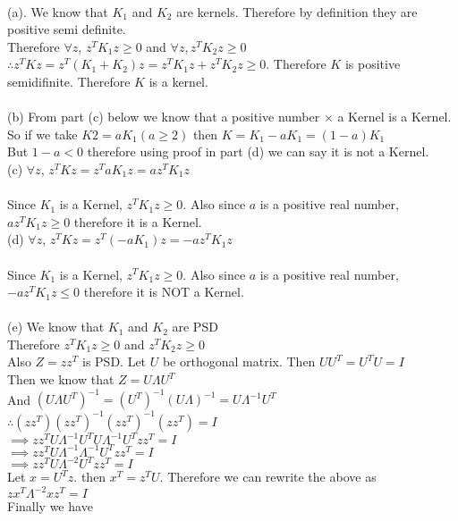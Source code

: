 \begin{answer}\\
(a). We know that $K_1$ and $K_2$ are kernels. Therefore by definition they are positive semi definite.\\
Therefore $\forall z$, $z^TK_1z \geq 0$ and $\forall z, z^TK_2z \geq 0$\\
$\therefore z^TKz=z^T(K_1+K_2)z = z^TK_1z+z^TK_2z \geq 0$. Therefore $K$ is positive semidifinite. Therefore $K$ is a kernel.\\
\\
(b) From part (c) below we know that a positive number $\times$ a Kernel is a Kernel. So if we take $K2=aK_1 (a \geq 2)$ then $K=K_1-aK_1=(1-a)K_1$\\
But $1-a <0$ therefore using proof in part (d) we can say it is not a Kernel.\\
(c) $\forall z$, $z^TKz=z^TaK_1z=az^TK_1z$\\\\
Since $K_1$ is a Kernel, $z^TK_1z \geq 0$. Also since $a$ is a positive real number, $az^TK_1z \geq 0$ therefore it is a Kernel.\\
(d) $\forall z$, $z^TKz=z^T(-aK_1)z=-az^TK_1z$\\\\
Since $K_1$ is a Kernel, $z^TK_1z \geq 0$. Also since $a$ is a positive real number, $-az^TK_1z \leq 0$ therefore it is NOT a Kernel.\\\\
(e) We know that $K_1$ and $K_2$ are PSD\\
Therefore $z^TK_1z \geq 0$ and $z^TK_2z \geq 0$\\
Also $Z=zz^T$ is PSD. Let $U$ be orthogonal matrix. Then $UU^T=U^TU=I$\\
Then we know that $Z=U\Lambda U^T$\\
And $(U\Lambda U^T)^{-1}=(U^T)^{-1}(U \Lambda)^{-1}=U \Lambda^{-1} U^T$\\
$\therefore (zz^T)(zz^T)^{-1}(zz^T)^{-1}(zz^T)=I$\\
$\implies zz^T U \Lambda^{-1} U^T U \Lambda^{-1} U^T zz^T=I$\\
$\implies zz^T U \Lambda^{-1} \Lambda^{-1} U^T zz^T=I$\\
$\implies zz^T U \Lambda^{-2} U^T zz^T=I$\\
Let $x=U^Tz$. then $x^T=z^TU$. Therefore we can rewrite the above as\\
$z x^T \Lambda^{-2} x z^T=I$\\
Finally we have \\

\end{answer}
